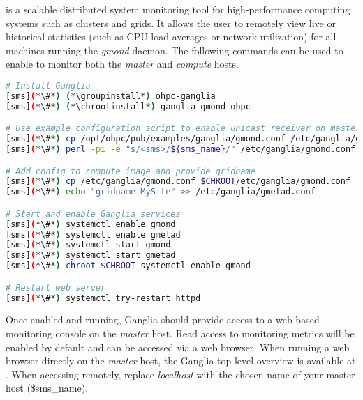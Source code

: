 \Ganglia{} is a scalable distributed system monitoring tool for high-performance
computing systems such as clusters and grids. It allows the user to remotely
view live or historical statistics (such as CPU load averages or network
utilization) for all machines running the {\em gmond} daemon. The following 
commands can be used to enable \Ganglia{} to monitor both the {\em master} and 
{\em compute} hosts.

\begin{lstlisting}[language=bash,keywords={},upquote=true]
# Install Ganglia
[sms](*\#*) (*\groupinstall*) ohpc-ganglia
[sms](*\#*) (*\chrootinstall*) ganglia-gmond-ohpc

# Use example configuration script to enable unicast receiver on master host
[sms](*\#*) cp /opt/ohpc/pub/examples/ganglia/gmond.conf /etc/ganglia/gmond.conf
[sms](*\#*) perl -pi -e "s/<sms>/${sms_name}/" /etc/ganglia/gmond.conf

# Add config to compute image and provide gridname 
[sms](*\#*) cp /etc/ganglia/gmond.conf $CHROOT/etc/ganglia/gmond.conf
[sms](*\#*) echo "gridname MySite" >> /etc/ganglia/gmetad.conf

# Start and enable Ganglia services
[sms](*\#*) systemctl enable gmond
[sms](*\#*) systemctl enable gmetad
[sms](*\#*) systemctl start gmond
[sms](*\#*) systemctl start gmetad
[sms](*\#*) chroot $CHROOT systemctl enable gmond

# Restart web server
[sms](*\#*) systemctl try-restart httpd
\end{lstlisting}

\noindent Once enabled and running, Ganglia should provide access to a web-based
monitoring console on the {\em master} host. Read access to monitoring metrics
will be enabled by default and can be accessed via a web browser. When running
a web browser directly on the {\em master} host, the Ganglia top-level overview
is available
at \href{http://localhost/ganglia}{\color{blue}{http://localhost/ganglia}}.
When accessing remotely, replace {\em localhost} with the chosen name of your
master host (\${sms\_name}).


